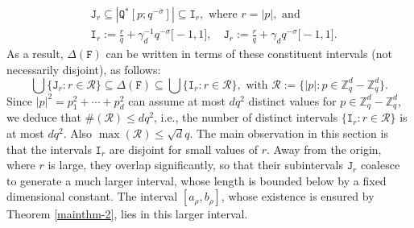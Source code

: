 \documentclass[a4paper,11pt]{amsart}
\numberwithin{equation}{section}
\begin{document}
\begin{align} 
&\mathtt J_r \subseteq |\mathtt Q^{\ast}[p; q^{-\sigma}]| \subseteq \mathtt I_r, \text{ where } r = |p|, \text{ and } \nonumber \\  
&\mathtt I_r := \frac{r}{q} + \gamma_d^{-1} q^{-\sigma} \bigl[-1, 1\bigr], \quad \mathtt J_r := \frac{r}{q} + \gamma_d q^{-\sigma} \bigl[-1, 1\bigr]. \label{IrJr}
\end{align}
As a result, $\Delta(\mathtt F)$ can be written in terms of these constituent intervals (not necessarily disjoint), as follows:
\begin{equation} 
\bigcup \bigl\{\mathtt J_r : r \in \mathcal R  \Bigr\} \subseteq \Delta(\mathtt F) \subseteq \bigcup \bigl\{\mathtt I_r : r \in \mathcal R \Bigr\}, \text{ with } \mathcal R := \bigl\{|p| : p \in \mathbb Z_{q}^d - \mathbb Z_q^d  \bigr\}.   \label{Falconer-E-upper-lower} 
\end{equation} 
Since $|p|^2 = p_1^2 + \cdots + p_d^2$ can assume at most $dq^2$ distinct values for $p \in \mathbb Z_q^d - \mathbb Z_q^d$, we deduce that $\#(\mathcal R) \leq dq^2$, i.e., the number of distinct intervals $\{\mathtt I_r : r \in \mathcal R\}$ is at most $dq^2$. Also $\max(\mathcal R) \leq \sqrt{d}q$. The main observation in this section is that  the intervals $\mathtt I_r$ are disjoint for small values of $r$. Away from the origin, where $r$ is large, they overlap significantly, so that their subintervals $\mathtt J_r$ coalesce to generate a much larger interval, whose length is bounded below by a fixed dimensional constant. The interval $[a_{\rho}, b_{\rho}]$, whose existence is ensured by Theorem \ref{mainthm-2}, lies in this larger interval.  
\end{document}
